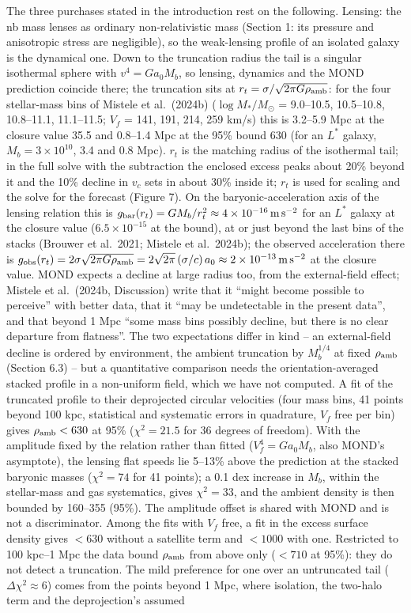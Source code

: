 \documentclass[
  10pt,
]{article}
\begin{document}
The three purchases stated in the introduction rest on the following.
Lensing: the nb mass lenses as ordinary non-relativistic mass (Section 1:
its pressure and anisotropic stress are negligible), so the
weak-lensing profile of an isolated galaxy is the dynamical one. Down to
the truncation radius the tail is a singular isothermal sphere with
$v^4=G a_0 M_b$, so lensing, dynamics and the MOND prediction
coincide there; the truncation sits at $r_t=\sigma/\sqrt{2\pi G\rho_{\rm amb}}$: for the four stellar-mass bins of Mistele et al.~(2024b) ($\log M_*/M_\odot$ = 9.0--10.5, 10.5--10.8, 10.8--11.1, 11.1--11.5; $V_f$ = 141, 191, 214, 259 km/s) this is 3.2--5.9 Mpc at the closure value 35.5 and 0.8--1.4 Mpc at the 95\% bound 630 (for an $L^*$ galaxy, $M_b=3\times10^{10}$, 3.4 and 0.8 Mpc). $r_t$ is the matching radius of the isothermal tail; in the full solve with the subtraction the enclosed excess peaks about 20\% beyond it and the 10\% decline in $v_c$ sets in about 30\% inside it; $r_t$ is used for scaling and the solve for the forecast (Figure 7). On the baryonic-acceleration axis of the lensing relation this is $g_{\rm bar}(r_t)=GM_b/r_t^2\approx 4\times10^{-16}\,{\rm m\,s^{-2}}$ for an $L^*$ galaxy at the closure value ($6.5\times10^{-15}$ at the bound), at or just beyond the last bins of the stacks (Brouwer et al.~2021; Mistele et al.~2024b); the observed acceleration there is $g_{\rm obs}(r_t)=2\sigma\sqrt{2\pi G\rho_{\rm amb}}=2\sqrt{2\pi}\,(\sigma/c)\,a_0\approx 2\times10^{-13}\,{\rm m\,s^{-2}}$ at the closure value. MOND expects a decline at large radius too, from the external-field effect; Mistele et al.~(2024b, Discussion) write that it ``might become possible to perceive'' with better data, that it ``may be undetectable in the present data'', and that beyond 1 Mpc ``some mass bins possibly decline, but there is no clear departure from flatness''. The two expectations differ in kind -- an external-field decline is ordered by environment, the ambient truncation by $M_b^{1/4}$ at fixed $\rho_{\rm amb}$ (Section 6.3) -- but a quantitative comparison needs the orientation-averaged stacked profile in a non-uniform field, which we have not computed. A fit of the truncated profile to their deprojected circular velocities (four mass bins, 41 points beyond 100 kpc, statistical and systematic errors in quadrature, $V_f$ free per bin) gives $\rho_{\rm amb}<630$ at 95\% ($\chi^2=21.5$ for 36 degrees of freedom). With the amplitude fixed by the relation rather than fitted ($V_f^4=Ga_0M_b$, also MOND's asymptote), the lensing flat speeds lie 5--13\% above the prediction at the stacked baryonic masses ($\chi^2=74$ for 41 points); a 0.1 dex increase in $M_b$, within the stellar-mass and gas systematics, gives $\chi^2=33$, and the ambient density is then bounded by 160--355 (95\%). The amplitude offset is shared with MOND and is not a discriminator. Among the fits with $V_f$ free, a fit in the excess surface density gives $<630$ without a satellite term and $<1000$ with one. Restricted to 100 kpc--1 Mpc the data bound $\rho_{\rm amb}$ from above only ($<710$ at 95\%): they do not detect a truncation. The mild preference for one over an untruncated tail ($\Delta\chi^2\approx6$) comes from the points beyond 1 Mpc, where isolation, the two-halo term and the deprojection's assumed 
\end{document}
